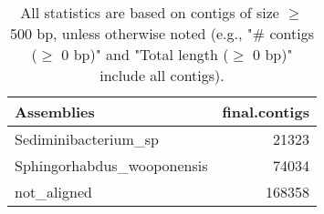 \documentclass[12pt,a4paper]{article}
\begin{document}
\begin{table}[ht]
\begin{center}
\caption{All statistics are based on contigs of size $\geq$ 500 bp, unless otherwise noted (e.g., "\# contigs ($\geq$ 0 bp)" and "Total length ($\geq$ 0 bp)" include all contigs).}
\begin{tabular}{|l*{1}{|r}|}
\hline
Assemblies & final.contigs \\ \hline
Sediminibacterium\_sp & 21323 \\ \hline
Sphingorhabdus\_wooponensis & 74034 \\ \hline
not\_aligned & 168358 \\ \hline
\end{tabular}
\end{center}
\end{table}
\end{document}
